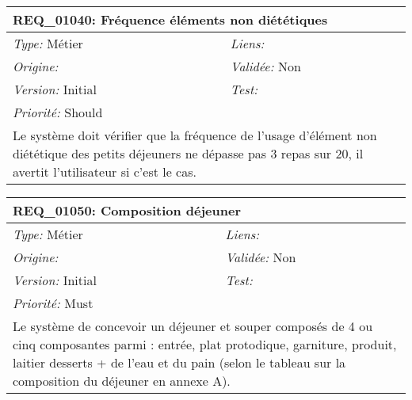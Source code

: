 \begin{table}[!h]

\begin{tabular}{|p{60mm}p{100mm}|}

\hline

\multicolumn{2}{|l|}{\textbf{REQ\_01040:} Fréquence éléments non diététiques} \\ \hline

\emph{Type:} Métier & \emph{Liens:}  \\

\emph{Origine:}  & \emph{Validée:} Non \\

\emph{Version:} Initial & \emph{Test:}  \\

\emph{Priorité:} Should & \\ \hline

\multicolumn{2}{|p{16cm}|}{Le système doit vérifier que la fréquence de l'usage d'élément non diététique des petits déjeuners ne dépasse pas 3 repas sur 20, il avertit l'utilisateur si c'est le cas.} \\ \hline

\end{tabular}

\end{table}



\begin{table}[!h]

\begin{tabular}{|p{60mm}p{100mm}|}

\hline

\multicolumn{2}{|l|}{\textbf{REQ\_01050:} Composition déjeuner} \\ \hline

\emph{Type:} Métier & \emph{Liens:}  \\

\emph{Origine:}  & \emph{Validée:} Non \\

\emph{Version:} Initial & \emph{Test:}  \\

\emph{Priorité:} Must & \\ \hline

\multicolumn{2}{|p{16cm}|}{Le système de concevoir un déjeuner et souper composés de 4 ou cinq composantes parmi : entrée, plat protodique, garniture, produit, laitier desserts + de l'eau et du pain (selon le tableau sur la composition du déjeuner en annexe A).} \\ \hline

\end{tabular}

\end{table}



